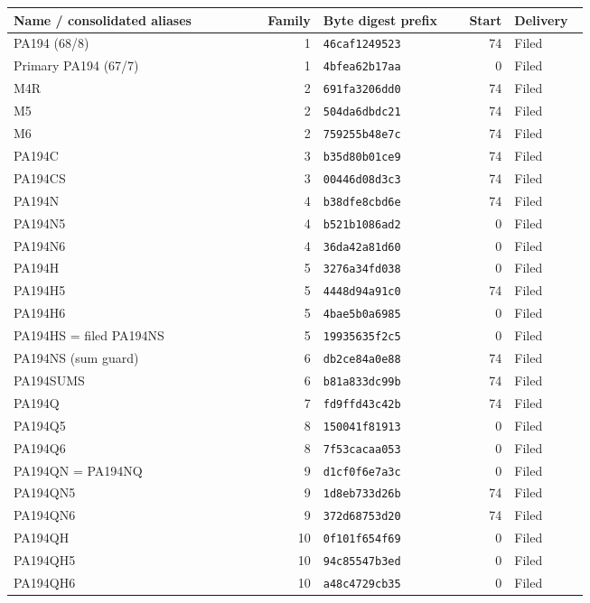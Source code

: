 \begingroup\small
\begin{longtable}{@{}>{\raggedright\arraybackslash}p{0.40\linewidth}r>{\raggedright\arraybackslash}p{0.22\linewidth}r>{\raggedright\arraybackslash}p{0.13\linewidth}@{}}
\toprule Name / consolidated aliases & Family & Byte digest prefix & Start & Delivery\\\midrule\endhead
PA194 (68/8) & 1 & \texttt{46caf1249523} & 74 & Filed\\
Primary PA194 (67/7) & 1 & \texttt{4bfea62b17aa} & 0 & Filed\\
M4R & 2 & \texttt{691fa3206dd0} & 74 & Filed\\
M5 & 2 & \texttt{504da6dbdc21} & 74 & Filed\\
M6 & 2 & \texttt{759255b48e7c} & 74 & Filed\\
PA194C & 3 & \texttt{b35d80b01ce9} & 74 & Filed\\
PA194CS & 3 & \texttt{00446d08d3c3} & 74 & Filed\\
PA194N & 4 & \texttt{b38dfe8cbd6e} & 74 & Filed\\
PA194N5 & 4 & \texttt{b521b1086ad2} & 0 & Filed\\
PA194N6 & 4 & \texttt{36da42a81d60} & 0 & Filed\\
PA194H & 5 & \texttt{3276a34fd038} & 0 & Filed\\
PA194H5 & 5 & \texttt{4448d94a91c0} & 74 & Filed\\
PA194H6 & 5 & \texttt{4bae5b0a6985} & 0 & Filed\\
PA194HS = filed PA194NS & 5 & \texttt{19935635f2c5} & 0 & Filed\\
PA194NS (sum guard) & 6 & \texttt{db2ce84a0e88} & 74 & Filed\\
PA194SUMS & 6 & \texttt{b81a833dc99b} & 74 & Filed\\
PA194Q & 7 & \texttt{fd9ffd43c42b} & 74 & Filed\\
PA194Q5 & 8 & \texttt{150041f81913} & 0 & Filed\\
PA194Q6 & 8 & \texttt{7f53cacaa053} & 0 & Filed\\
PA194QN = PA194NQ & 9 & \texttt{d1cf0f6e7a3c} & 0 & Filed\\
PA194QN5 & 9 & \texttt{1d8eb733d26b} & 74 & Filed\\
PA194QN6 & 9 & \texttt{372d68753d20} & 74 & Filed\\
PA194QH & 10 & \texttt{0f101f654f69} & 0 & Filed\\
PA194QH5 & 10 & \texttt{94c85547b3ed} & 0 & Filed\\
PA194QH6 & 10 & \texttt{a48c4729cb35} & 0 & Filed\\

\end{longtable}
